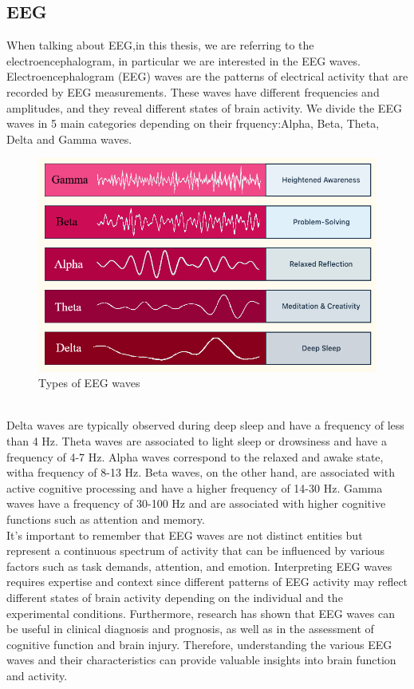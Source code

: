 \documentclass[a4paper]{sapthesis}
\begin{document}
\subsection{EEG}
When talking about EEG,in this thesis, we are referring to the
electroencephalogram, in particular we are interested in the 
EEG waves. Electroencephalogram (EEG) waves are the patterns 
of electrical activity that are recorded by EEG measurements. 
These waves have different frequencies and amplitudes, and they 
reveal different states of brain activity. We divide the EEG waves in 
5 main categories depending on their frquency:Alpha, Beta, Theta, 
Delta and Gamma waves.\begin{figure}[h]
  \includegraphics[scale=0.6]{waves}
  \centering
  \caption{Types of EEG waves}\label{fig:waves}
  
  \end{figure}\newline \\
Delta waves are typically observed during deep sleep and have a frequency
of less than 4 Hz. Theta waves are associated to light sleep or 
drowsiness and have a frequency of 4-7 Hz. Alpha waves correspond to the 
relaxed and awake state, witha frequency of 8-13 Hz. Beta waves, on the other 
hand, are associated with active cognitive processing and have a higher 
frequency of 14-30 Hz. Gamma waves have a frequency of 30-100 Hz and are associated with higher 
cognitive functions such as attention and memory.\newline \\
It's important to remember that EEG waves are not distinct entities but 
represent a continuous spectrum of activity that can be influenced by
various factors such as task demands, attention, and emotion. Interpreting EEG waves requires expertise 
and context since different patterns of EEG activity may reflect 
different states of brain activity depending on the individual and the 
experimental conditions. Furthermore, research has shown that EEG waves
can be useful in clinical diagnosis and prognosis, as well as in the
assessment of cognitive function and brain injury. Therefore, 
understanding the various EEG waves and their characteristics 
can provide valuable insights into brain function and activity.
\end{document}
